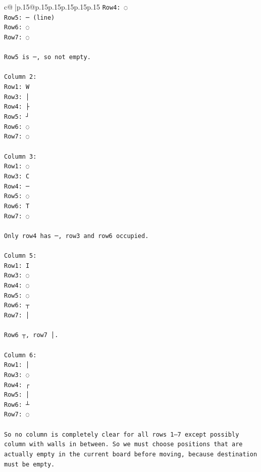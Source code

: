 \documentclass{article}
\begin{document}
{\begin{supertabular}{c@{$\;$}|p{.15\linewidth}@{}p{.15\linewidth}p{.15\linewidth}p{.15\linewidth}p{.15\linewidth}p{.15\linewidth}}
{{{\texttt{Row4: ◌  } \\
\texttt{Row5: ─ (line)  } \\
\texttt{Row6: ◌  } \\
\texttt{Row7: ◌  } \\
\\ 
\texttt{Row5 is ─, so not empty.} \\
\\ 
\texttt{Column 2:  } \\
\texttt{Row1: W  } \\
\texttt{Row3: │  } \\
\texttt{Row4: ├  } \\
\texttt{Row5: ┘  } \\
\texttt{Row6: ◌  } \\
\texttt{Row7: ◌  } \\
\\ 
\texttt{Column 3:  } \\
\texttt{Row1: ◌  } \\
\texttt{Row3: C  } \\
\texttt{Row4: ─  } \\
\texttt{Row5: ◌  } \\
\texttt{Row6: T  } \\
\texttt{Row7: ◌  } \\
\\ 
\texttt{Only row4 has ─, row3 and row6 occupied.} \\
\\ 
\texttt{Column 5:  } \\
\texttt{Row1: I  } \\
\texttt{Row3: ◌  } \\
\texttt{Row4: ◌  } \\
\texttt{Row5: ◌  } \\
\texttt{Row6: ┬  } \\
\texttt{Row7: │  } \\
\\ 
\texttt{Row6 ┬, row7 │.} \\
\\ 
\texttt{Column 6:  } \\
\texttt{Row1: │  } \\
\texttt{Row3: ◌  } \\
\texttt{Row4: ┌  } \\
\texttt{Row5: │  } \\
\texttt{Row6: ┴  } \\
\texttt{Row7: ◌  } \\
\\ 
\texttt{So no column is completely clear for all rows 1–7 except possibly column with walls in between. So we must choose positions that are actually empty in the current board before moving, because destination must be empty.} \\
}}}
\end{supertabular}}
\end{document}
